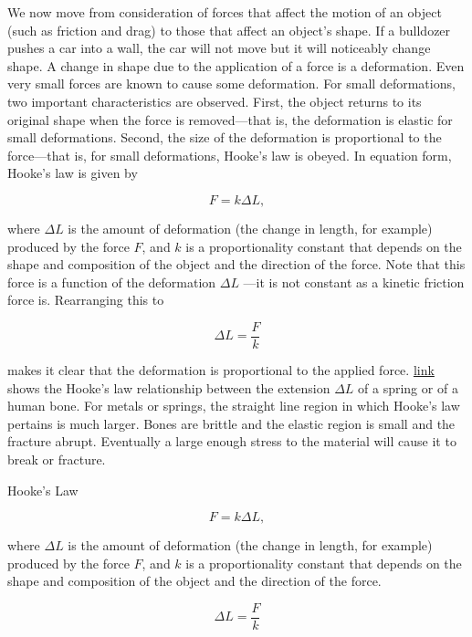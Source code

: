 \documentclass[
]{book}
\begin{document}
We now move from consideration of forces that affect the motion of an
object (such as friction and drag) to those that affect an object's
shape. If a bulldozer pushes a car into a wall, the car will not move
but it will noticeably change shape. A change in shape due to the
application of a force is a {deformation}. Even very
small forces are known to cause some deformation. For small
deformations, two important characteristics are observed. First, the
object returns to its original shape when the force is removed---that
is, the deformation is elastic for small deformations. Second, the size
of the deformation is proportional to the force---that is, for small
deformations, Hooke's law is obeyed. In equation form, {Hooke's
law} is given by

\leavevmode{}%
\[{{F = k\Delta L},}{}\]

where \({\Delta L}{}\) is the amount of deformation (the change in length,
for example) produced by the force
\(F{}\)\emph{}, and \(k{}\) is a proportionality
constant that depends on the shape and composition of the object and the
direction of the force. Note that this force is a function of the
deformation \({\Delta L}{}\) ---it is not constant as a kinetic friction
force is. Rearranging this to

\leavevmode{}%
\[{\Delta L = \frac{F}{k}}{}\]

makes it clear that the deformation is proportional to the applied
force. \protect\hyperlink{import-auto-id1165298678464}{link}
shows the Hooke's law relationship between the extension \({\Delta L}{}\)
of a spring or of a human bone. For metals or springs, the straight line
region in which Hooke's law pertains is much larger. Bones are brittle
and the elastic region is small and the fracture abrupt. Eventually a
large enough stress to the material will cause it to break or fracture.

\hypertarget{fs-id1165298979850}{}
Hooke's Law

\leavevmode{}%
\[{F = {k\Delta L}},{}\]

where \({\Delta L}{}\) is the amount of deformation (the change in length,
for example) produced by the force
\(F{}\)\emph{}, and \(k{}\) is a proportionality
constant that depends on the shape and composition of the object and the
direction of the force.

\leavevmode{}%
\[{\Delta L = \frac{F}{k}}{}\]
\end{document}
